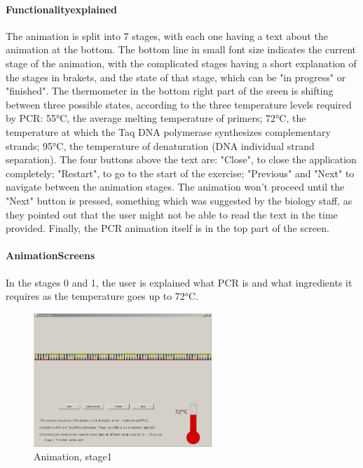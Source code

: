 \paragraph{Functionalityexplained}
The animation is split into 7 stages, with each one having a text about the animation at the bottom. The bottom line in small font size indicates the current stage of the animation, with the complicated stages having a short explanation of the stages in brakets, and the state of that stage, which can be "in progress" or "finished". The thermometer in the bottom right part of the sreen is shifting between three possible states, according to the three temperature levels required by PCR: 55°C, the average melting temperature of primers; 72°C, the temperature at which the Taq DNA polymerase synthesizes complementary strands; 95°C, the temperature of denaturation (DNA individual strand separation). The four buttons above the text are: "Close", to close the application completely; "Restart", to go to the start of the exercise; "Previous" and "Next" to navigate between the animation stages. The animation won't proceed until the "Next" button is pressed, something which was suggested by the biology staff, as they pointed out that the user might not be able to read the text in the time provided. Finally, the PCR animation itself is in the top part of the screen.

\paragraph{AnimationScreens}

In the stages 0 and 1, the user is explained what PCR is and what ingredients it requires as the temperature goes up to 72°C.

\begin{figure}[h]
  \begin{center}
	\includegraphics[width=0.6\textwidth]{./images/AnimImpl/Stage1.png}
    \caption{
      \label{fig:AnimImpl:stage1}
      Animation, stage1
    }
  \end{center}
\end{figure}


